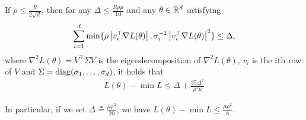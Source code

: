 \begin{lemma}\label{lem:small_decrement_imply_small_loss}
	If $\rho \le \frac{R}{2\sqrt{d}}$, then for any $\Delta\le \frac{R\rho\mu}{10}$  and any $\theta\in\mathbb{R}^d$ satisfying
	 \begin{align}
\sum_{i=1}^d \min\{ \rho \left| v_i^\top \nabla L(\theta) \right|, \sigma_i^{-1}\left| v_i^\top \nabla L(\theta) \right|^2\} \le  \Delta,
	 \end{align}
 where $\nabla^2  L(\theta) = V^\top \Sigma V$	  is the eigendecomposition of $\nabla ^2 L(\theta)$, $v_i$ is the $i$th row of $V$ and $\Sigma = {\rm diag}(\sigma_1,\ldots,\sigma_d)$, it holds that 
 \begin{align}
     L(\theta) -\min L\le \Delta+ \frac{25\Delta^2}{\rho^2\mu}
 \end{align}
 
 In particular, if we set $\Delta\triangleq \frac{\mu\rho^2}{20}$, we have $L(\theta) -\min L\le \frac{\mu\rho^2}{8}$.
\end{lemma}

